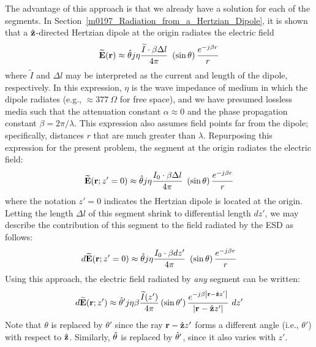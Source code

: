 The advantage of this approach is that we already have a solution for each of the segments.
In Section~\ref{m0197_Radiation_from_a_Hertzian_Dipole}, it is shown that a $\hat{\bf z}$-directed Hertzian dipole at the origin radiates the electric field
%
\begin{equation}
\widetilde{\bf E}({\bf r}) \approx \hat{\bf \theta} j\eta \frac{\widetilde{I}\cdot\beta \Delta l}{4\pi}~\left(\sin\theta\right) \frac{e^{-j\beta r}}{r} 
\end{equation}
%
where $\widetilde{I}$ and $\Delta l$ may be interpreted as the current and length of the dipole, respectively.
In this expression, $\eta$ is the wave impedance of medium in which the dipole radiates (e.g., $\approx 377~\Omega$ for free space), and we have presumed lossless media such that the attenuation constant $\alpha\approx 0$ and the phase propagation constant $\beta=2\pi/\lambda$.   
This expression also assumes field points far from the dipole; specifically, distances $r$ that are much greater than $\lambda$.
Repurposing this expression for the present problem, the segment at the origin radiates the electric field:
%
\begin{equation}
\widetilde{\bf E}({\bf r};z'=0) \approx \hat{\bf \theta} j\eta \frac{I_0\cdot\beta \Delta l}{4\pi}~\left(\sin\theta\right) \frac{e^{-j\beta r}}{r} 
\end{equation}
%
where the notation $z'=0$ indicates the Hertzian dipole is located at the origin.
Letting the length $\Delta l$ of this segment shrink to differential length $dz'$, we may describe the contribution of this segment to the field radiated by the ESD as follows:
%
\begin{equation}
d\widetilde{\bf E}({\bf r};z'=0) \approx \hat{\bf \theta} j\eta \frac{I_0\cdot\beta dz'}{4\pi}~\left(\sin\theta\right) \frac{e^{-j\beta r}}{r} 
\end{equation}
% 
Using this approach, the electric field radiated by \emph{any} segment can be written:
%
\begin{equation}
d\widetilde{\bf E}({\bf r};z') \approx 
\hat{\bf \theta}' j\eta\beta \frac{\widetilde{I}(z')}{4\pi}\left(\sin\theta'\right) \frac{e^{-j\beta \left|{\bf r}-\hat{\bf z}z'\right|}}{\left|{\bf r}-\hat{\bf z}z'\right|}~dz'
\end{equation}
%
Note that $\theta$ is replaced by $\theta'$ since the ray ${\bf r}-\hat{\bf z}z'$ forms a different angle (i.e., $\theta'$) with respect to $\hat{\bf z}$.
Similarly, $\hat{\bf \theta}$ is replaced by $\hat{\bf \theta}'$, since it also varies with $z'$.
